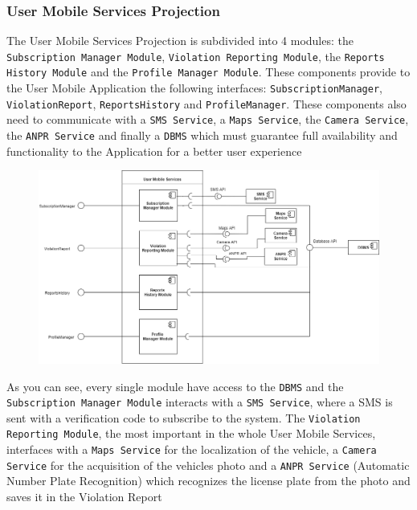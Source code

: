 \documentclass[12pt,a4paper]{article}
\begin{document}
\subsubsection{User Mobile Services Projection}
The User Mobile Services Projection is subdivided into 4 modules: the \texttt{Subscription Manager Module}, \texttt{Violation Reporting Module}, the \texttt{Reports History Module} and the \texttt{Profile Manager Module}. These components provide to the User Mobile Application the following interfaces: \texttt{SubscriptionManager}, \texttt{ViolationReport}, \texttt{ReportsHistory} and \texttt{ProfileManager}. These components also need to communicate with a \texttt{SMS Service}, a \texttt{Maps Service}, the \texttt{Camera Service}, the \texttt{ANPR Service} and finally a \texttt{DBMS} which must guarantee full availability and functionality to the Application for a better user experience
\begin{figure}[H]
		\centering
		\includegraphics[width=1.2\linewidth]{../assets/images/USER PROJECTION.png}
	\end{figure}
As you can see, every single module have access to the \texttt{DBMS} and the \texttt{Subscription Manager Module} interacts with a \texttt{SMS Service}, where a SMS is sent with a verification code to subscribe to the system. The \texttt{Violation Reporting Module}, the most important in the whole User Mobile Services, interfaces with a \texttt{Maps Service} for the localization of the vehicle, a \texttt{Camera Service} for the acquisition of the vehicles photo and a \texttt{ANPR Service} (Automatic Number Plate Recognition) which recognizes the license plate from the photo and saves it in the Violation Report 
\end{document}
